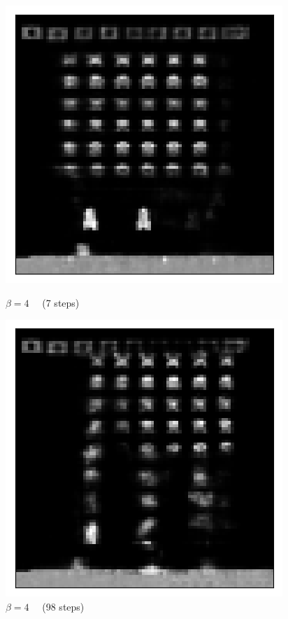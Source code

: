 \begin{figure}[h!]
\begin{multicols}{4}
    \includegraphics[scale=0.4]{figures/results/indiscriminate_decoupling/beta_4_posterior_sample_7.png}
    \caption{$\beta=4\quad$ (7 steps)}
    \includegraphics[scale=0.4]{figures/results/indiscriminate_decoupling/beta_4_posterior_sample_98.png}
    \caption{$\beta=4\quad$ (98 steps)}
\end{multicols}


\end{figure}
